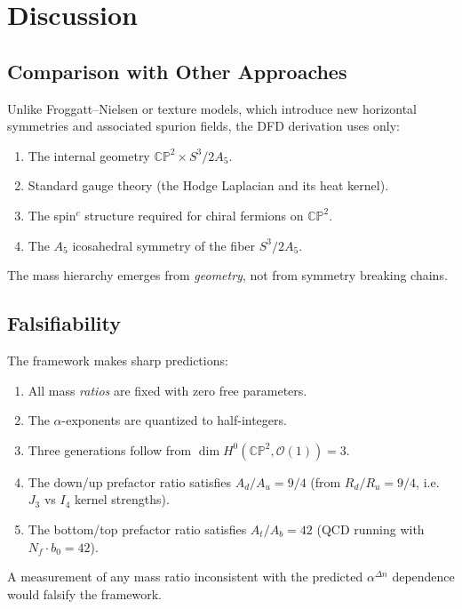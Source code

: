 \documentclass[11pt,a4paper]{article}
\newcommand{\CP}{\mathbb{CP}}
\begin{document}
\section{Discussion}
\label{sec:discussion}

\subsection{Comparison with Other Approaches}

Unlike Froggatt--Nielsen or texture models, which introduce new horizontal
symmetries and associated spurion fields, the DFD derivation uses only:
\begin{enumerate}
\item The internal geometry $\CP^2\times S^3/2A_5$.
\item Standard gauge theory (the Hodge Laplacian and its heat kernel).
\item The spin$^c$ structure required for chiral fermions on $\CP^2$.
\item The $A_5$ icosahedral symmetry of the fiber $S^3/2A_5$.
\end{enumerate}

The mass hierarchy emerges from \emph{geometry}, not from symmetry breaking
chains.

\subsection{Falsifiability}

The framework makes sharp predictions:
\begin{enumerate}
\item All mass \emph{ratios} are fixed with zero free parameters.
\item The $\alpha$-exponents are quantized to half-integers.
\item Three generations follow from $\dim H^0(\CP^2,\mathcal{O}(1)) = 3$.
\item The down/up prefactor ratio satisfies $A_d/A_u = 9/4$ (from
      $R_d/R_u = 9/4$, i.e.\ $J_3$ vs $I_4$ kernel strengths).
\item The bottom/top prefactor ratio satisfies $A_t/A_b = 42$ (QCD running
      with $N_f\cdot b_0 = 42$).
\end{enumerate}

A measurement of any mass ratio inconsistent with the predicted $\alpha^{\Delta n}$
dependence would falsify the framework.
\end{document}
